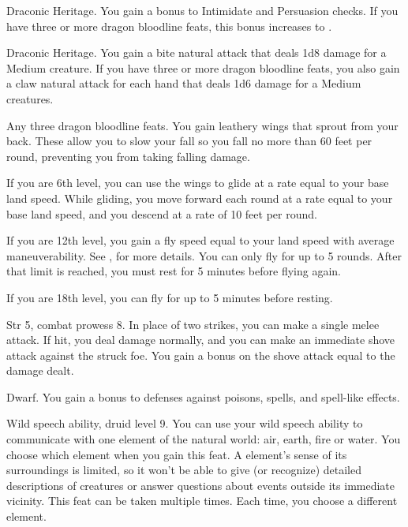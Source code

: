 \featpre Draconic Heritage.
\featben You gain a  bonus to Intimidate and Persuasion checks.
If you have three or more dragon bloodline feats, this bonus increases to .

\featpre Draconic Heritage.
\featben You gain a bite natural attack that deals 1d8 damage for a Medium creature.
If you have three or more dragon bloodline feats, you also gain a claw natural attack for each hand that deals 1d6 damage for a Medium creatures.

\featpre Any three dragon bloodline feats.
\featben You gain leathery wings that sprout from your back.
These allow you to slow your fall so you fall no more than 60 feet per round, preventing you from taking falling damage.

If you are 6th level, you can use the wings to glide at a rate equal to your base land speed.
While gliding, you move forward each round at a rate equal to your base land speed, and you descend at a rate of 10 feet per round.

If you are 12th level, you gain a fly speed equal to your land speed with average maneuverability.
See , for more details.
You can only fly for up to 5 rounds.
After that limit is reached, you must rest for 5 minutes before flying again.

If you are 18th level, you can fly for up to 5 minutes before resting.

\featpres Str 5, combat prowess 8.
\featben In place of two strikes, you can make a single melee attack.
If hit, you deal damage normally, and you can make an immediate shove attack against the struck foe.
You gain a bonus on the shove attack equal to the damage dealt.

\featpre Dwarf.
\featben You gain a  bonus to defenses against poisons, spells, and spell-like effects.

\featpre Wild speech ability, druid level 9.
\featben You can use your wild speech ability to communicate with one element of the natural world: air, earth, fire or water.
You choose which element when you gain this feat.
A element's sense of its surroundings is limited, so it won't be able to give (or recognize) detailed descriptions of creatures or answer questions about events outside its immediate vicinity.
 This feat can be taken multiple times.
Each time, you choose a different element.

